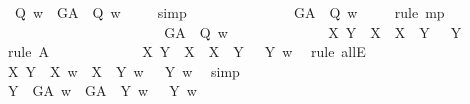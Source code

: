 \begin{isabellebody}
\ {\isachardoublequoteopen}{\isasymP}\ Q\ w\ {\isasymlongrightarrow}\ {\isacharparenleft}G\isactrlsup A\ {\isasymRrightarrow}\ Q{\isacharparenright}\ w{\isachardoublequoteclose}\ \isamarkupfalse%
\ {}\ \isamarkupfalse%
\ simp\ \isanewline
\ \ \ \ \ \ \ \ \ \ \ \ \isamarkupfalse%
\ {\isachardoublequoteopen}{\isacharparenleft}G\isactrlsup A\ {\isasymRrightarrow}\ Q{\isacharparenright}\ w{\isachardoublequoteclose}\ \isamarkupfalse%
\ {}\ \isamarkupfalse%
\ {\isacharparenleft}rule\ mp{\isacharparenright}\ %
\isanewline
\ \ \ \ \ \ \ \ \ \isamarkupfalse%
\isanewline
\ \ \ \ \ \ \ \ \ \ \ \isamarkupfalse%
\ {}{\isacharcolon}\ {\isachardoublequoteopen}{\isacharparenleft}G\isactrlsup A\ {\isasymRrightarrow}\ Q{\isacharparenright}\ w{\isachardoublequoteclose}\ %
\isanewline
\ \ \ \ \ \ \ \ \ \ \ \isamarkupfalse%
\ {\isachardoublequoteopen}{\isasymlfloor}\isactrlbold {\isasymforall}X\ Y{\isachardot}\ {\isacharparenleft}{\isasymP}\ X\ \isactrlbold {\isasymand}\ {\isacharparenleft}X\ {\isasymRrightarrow}\ Y{\isacharparenright}{\isacharparenright}\ \isactrlbold {\isasymrightarrow}\ {\isasymP}\ Y{\isasymrfloor}{\isachardoublequoteclose}\ \isamarkupfalse%
\ {\isacharparenleft}rule\ A{}{\isacharparenright}\isanewline
\ \ \ \ \ \ \ \ \ \ \ \isamarkupfalse%
\ {\isachardoublequoteopen}{\isacharparenleft}\isactrlbold {\isasymforall}X\ Y{\isachardot}\ {\isacharparenleft}{\isasymP}\ X\ \isactrlbold {\isasymand}\ {\isacharparenleft}X\ {\isasymRrightarrow}\ Y{\isacharparenright}{\isacharparenright}\ \isactrlbold {\isasymrightarrow}\ {\isasymP}\ Y{\isacharparenright}\ w{\isachardoublequoteclose}\ \isamarkupfalse%
\ {\isacharparenleft}rule\ allE{\isacharparenright}\isanewline
\ \ \ \ \ \ \ \ \ \ \ \isamarkupfalse%
\ {\isachardoublequoteopen}{\isasymforall}X\ Y{\isachardot}\ {\isacharparenleft}{\isasymP}\ X\ w\ {\isasymand}\ {\isacharparenleft}X\ {\isasymRrightarrow}\ Y{\isacharparenright}\ w{\isacharparenright}\ {\isasymlongrightarrow}\ {\isasymP}\ Y\ w{\isachardoublequoteclose}\ \isamarkupfalse%
\ simp\isanewline
\ \ \ \ \ \ \ \ \ \ \ \isamarkupfalse%
\ {\isachardoublequoteopen}{\isasymforall}Y{\isachardot}\ {\isacharparenleft}{\isasymP}\ G\isactrlsup A\ w\ {\isasymand}\ {\isacharparenleft}G\isactrlsup A\ {\isasymRrightarrow}\ Y{\isacharparenright}\ w{\isacharparenright}\ {\isasymlongrightarrow}\ {\isasymP}\ Y\ w{\isachardoublequoteclose}\ \isamarkupfalse%

\end{isabellebody}
